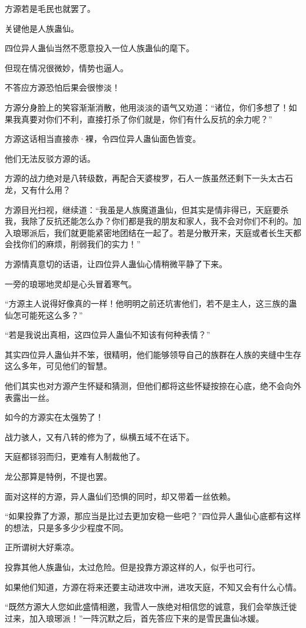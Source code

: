 \begin{this_body}
方源若是毛民也就罢了。

关键他是人族蛊仙。

四位异人蛊仙当然不愿意投入一位人族蛊仙的麾下。

但现在情况很微妙，情势也逼人。

不答应方源恐怕后果会很惨淡！

方源分身脸上的笑容渐渐消散，他用淡淡的语气又劝道：“诸位，你们多想了！如果我真要对你们不利，直接打杀了你们就是，你们有什么反抗的余力呢？”

方源这话相当直接赤·裸，令四位异人蛊仙面色皆变。

他们无法反驳方源的话。

方源的战力绝对是八转级数，再配合天婆梭罗，石人一族虽然还剩下一头太古石龙，又有什么用？

方源目光扫视，继续道：“我虽是人族魔道蛊仙，但其实是情非得已，天庭要杀我，我除了反抗还能怎么办？你们都是我的朋友和家人，我不会对你们不利的。加入琅琊派后，我们就更能紧密地团结在一起了。若是分散开来，天庭或者长生天都会找你们的麻烦，削弱我们的实力！”

方源情真意切的话语，让四位异人蛊仙心情稍微平静了下来。

一旁的琅琊地灵却是心头冒着寒气。

“方源主人说得好像真的一样！他明明之前还坑害他们，若不是主人，这三族的蛊仙怎可能死这么多？”

“若是我说出真相，这四位异人蛊仙不知该有何种表情？”

其实四位异人蛊仙并不笨，很精明，他们能够领导自己的族群在人族的夹缝中生存这么多年，可见他们的智慧。

他们其实也对方源产生怀疑和猜测，但他们都将这些怀疑按捺在心底，绝不会向外表露出一丝。

如今的方源实在太强势了！

战力骇人，又有八转的修为了，纵横五域不在话下。

天庭都铩羽而归，更难有人制裁他了。

龙公那算是特例，不提也罢。

面对这样的方源，异人蛊仙们恐惧的同时，却又带着一丝依赖。

“如果投靠了方源，那应当是比过去更加安稳一些吧？”四位异人蛊仙心底都有这样的想法，只是多多少少程度不同。

正所谓树大好乘凉。

投靠其他人族蛊仙，太过危险。但是投靠方源这样的人，似乎也可行。

如果他们知道，方源在将来还要主动进攻中洲，进攻天庭，不知又会有什么心情。

“既然方源大人您如此盛情相邀，我雪人一族绝对相信您的诚意，我们会举族迁徙过来，加入琅琊派！”一阵沉默之后，首先答应下来的是雪民蛊仙冰媛。


\end{this_body}
